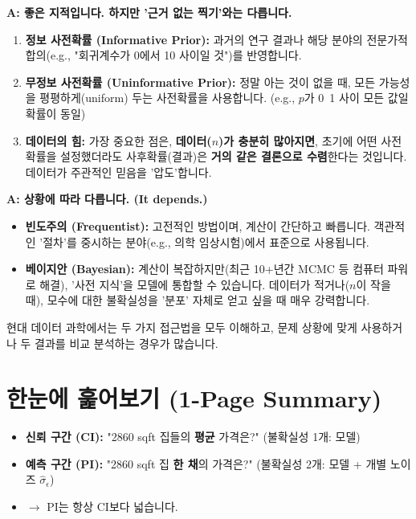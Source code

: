 \documentclass[11pt,a4paper]{book}
\theoremstyle{definition}
\begin{document}
\begin{examplebox}[title=Q: 사전확률(Prior)은 그냥 '찍는' 건가요? 너무 주관적이지 않나요?]
    \textbf{A: 좋은 지적입니다. 하지만 '근거 없는 찍기'와는 다릅니다.}
    \begin{enumerate}
        \item \textbf{정보 사전확률 (Informative Prior):} 과거의 연구 결과나 해당 분야의 전문가적 합의(e.g., "회귀계수가 0에서 10 사이일 것")를 반영합니다.
        \item \textbf{무정보 사전확률 (Uninformative Prior):} 정말 아는 것이 없을 때, 모든 가능성을 평평하게(uniform) 두는 사전확률을 사용합니다. (e.g., $p$가 0~1 사이 모든 값일 확률이 동일)
        \item \textbf{데이터의 힘:} 가장 중요한 점은, \textbf{데이터($n$)가 충분히 많아지면}, 초기에 어떤 사전확률을 설정했더라도 사후확률(결과)은 \textbf{거의 같은 결론으로 수렴}한다는 것입니다. 데이터가 주관적인 믿음을 '압도'합니다.
    \end{enumerate}
\end{examplebox}

\begin{examplebox}[title=Q: 빈도주의와 베이지안 중 어느 것이 더 좋은가요?]
    \textbf{A: 상황에 따라 다릅니다. (It depends.)}
    \begin{itemize}
        \item \textbf{빈도주의 (Frequentist):} 고전적인 방법이며, 계산이 간단하고 빠릅니다. 객관적인 '절차'를 중시하는 분야(e.g., 의학 임상시험)에서 표준으로 사용됩니다.
        \item \textbf{베이지안 (Bayesian):} 계산이 복잡하지만(최근 10+년간 MCMC 등 컴퓨터 파워로 해결), '사전 지식'을 모델에 통합할 수 있습니다. 데이터가 적거나($n$이 작을 때), 모수에 대한 불확실성을 '분포' 자체로 얻고 싶을 때 매우 강력합니다.
    \end{itemize}
    현대 데이터 과학에서는 두 가지 접근법을 모두 이해하고, 문제 상황에 맞게 사용하거나 두 결과를 비교 분석하는 경우가 많습니다.
\end{examplebox}


\section{한눈에 훑어보기 (1-Page Summary)}


\begin{tcolorbox}[title={신뢰 구간 (Mean) vs. 예측 구간 (Single)}]
    \begin{itemize}
        \item \textbf{신뢰 구간 (CI):} "2860 sqft 집들의 \textbf{평균} 가격은?"
            (불확실성 1개: 모델)
        \item \textbf{예측 구간 (PI):} "2860 sqft 집 \textbf{한 채}의 가격은?"
            (불확실성 2개: 모델 + 개별 노이즈 $\hat{\sigma}_\epsilon$)
        \item $\rightarrow$ PI는 항상 CI보다 넓습니다.
    \end{itemize}
\end{tcolorbox}
\end{document}
